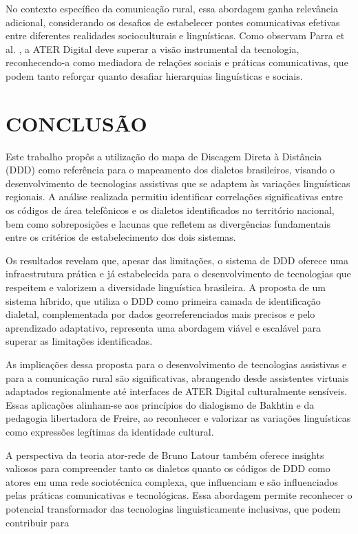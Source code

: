 No contexto específico da comunicação rural, essa abordagem ganha relevância adicional, considerando os desafios de estabelecer pontes comunicativas efetivas entre diferentes realidades socioculturais e linguísticas. Como observam Parra et al. \cite{parra2022ater}, a ATER Digital deve superar a visão instrumental da tecnologia, reconhecendo-a como mediadora de relações sociais e práticas comunicativas, que podem tanto reforçar quanto desafiar hierarquias linguísticas e sociais.













\chapter{CONCLUSÃO}
Este trabalho propôs a utilização do mapa de Discagem Direta à Distância (DDD) como referência para o mapeamento dos dialetos brasileiros, visando o desenvolvimento de tecnologias assistivas que se adaptem às variações linguísticas regionais. A análise realizada permitiu identificar correlações significativas entre os códigos de área telefônicos e os dialetos identificados no território nacional, bem como sobreposições e lacunas que refletem as divergências fundamentais entre os critérios de estabelecimento dos dois sistemas.

Os resultados revelam que, apesar das limitações, o sistema de DDD oferece uma infraestrutura prática e já estabelecida para o desenvolvimento de tecnologias que respeitem e valorizem a diversidade linguística brasileira. A proposta de um sistema híbrido, que utiliza o DDD como primeira camada de identificação dialetal, complementada por dados georreferenciados mais precisos e pelo aprendizado adaptativo, representa uma abordagem viável e escalável para superar as limitações identificadas.

As implicações dessa proposta para o desenvolvimento de tecnologias assistivas e para a comunicação rural são significativas, abrangendo desde assistentes virtuais adaptados regionalmente até interfaces de ATER Digital culturalmente sensíveis. Essas aplicações alinham-se aos princípios do dialogismo de Bakhtin e da pedagogia libertadora de Freire, ao reconhecer e valorizar as variações linguísticas como expressões legítimas da identidade cultural.

A perspectiva da teoria ator-rede de Bruno Latour também oferece insights valiosos para compreender tanto os dialetos quanto os códigos de DDD como atores em uma rede sociotécnica complexa, que influenciam e são influenciados pelas práticas comunicativas e tecnológicas. Essa abordagem permite reconhecer o potencial transformador das tecnologias linguisticamente inclusivas, que podem contribuir para

